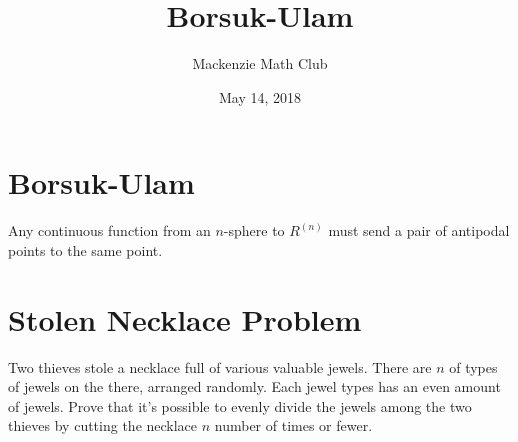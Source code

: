 

\title{Borsuk-Ulam}
\author{Mackenzie Math Club}
\date{May 14, 2018}



	\section*{Borsuk-Ulam}
		Any continuous function from an $n$-sphere to $R^(n)$ must send a pair of antipodal points to the same point.
	\section*{Stolen Necklace Problem}
		Two thieves stole a necklace full of various valuable jewels. There are $n$ of types of jewels on the there, arranged randomly. Each jewel types has an even amount of jewels. Prove that it’s possible to evenly divide the jewels among the two thieves by cutting the necklace $n$ number of times or fewer.

